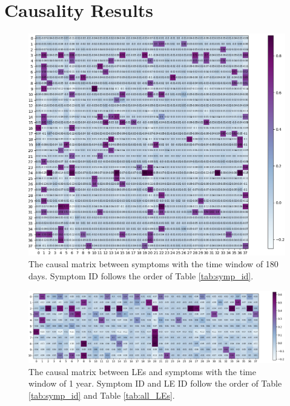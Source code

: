 \section{Causality Results}
\label{sec:appendixB}

\begin{figure}[th]
	\centering
	\includegraphics[width=\linewidth]{figures/heat_map_symps_180_2.png}
	\caption{The causal matrix between symptoms with the time window of 180 days. Symptom ID follows the order of Table \ref{tab:symp_id}.}
	\label{fig:heat_map_symps}
\end{figure}

\begin{figure}[th]
	\centering
	\includegraphics[width=\linewidth]{figures/heat_map_LEs_365_3.png}
	\caption{The causal matrix between LEs and symptoms with the time window of 1 year. Symptom ID and LE ID follow the order of Table \ref{tab:symp_id} and Table \ref{tab:all_LEs}.}
	\label{fig:heat_map_LEs}
\end{figure}


